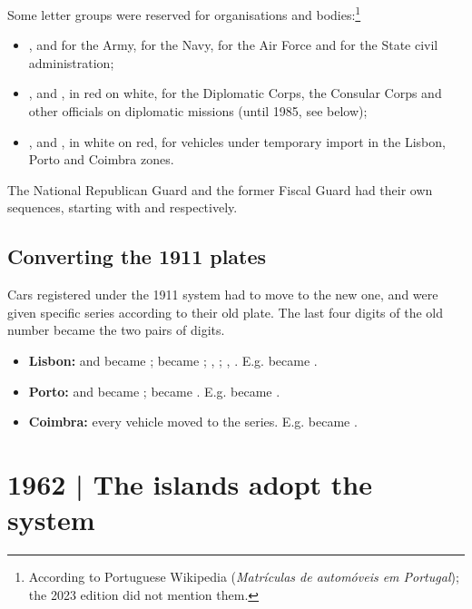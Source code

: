 Some letter groups were reserved for organisations and bodies:\footnote{According to Portuguese Wikipedia (\emph{Matrículas de automóveis em Portugal}); the 2023 edition did not mention them.}
\begin{itemize}
  \item {},  and  for the Army,  for the
        Navy,  for the Air Force and  for the State civil
        administration;
  \item {},  and , in red on white, for the Diplomatic
        Corps, the Consular Corps and other officials on diplomatic missions
        (until 1985, see below);
  \item {},  and , in white on red, for vehicles
        under temporary import in the Lisbon, Porto and Coimbra zones.
\end{itemize}
The National Republican Guard and the former Fiscal Guard had their own
sequences, starting with  and  respectively.

\subsection{Converting the 1911 plates}

Cars registered under the 1911 system had to move to the new one, and were given
specific series according to their old plate. The last four digits of the old
number became the two pairs of digits.

\begin{itemize}
  \item \textbf{Lisbon:}  and  became ;
         became ; ,
        ; , .
        E.g.  became .
  \item \textbf{Porto:}  and  became ;
         became .
        E.g.  became .
  \item \textbf{Coimbra:} every vehicle moved to the  series.
        E.g.  became .
\end{itemize}

\section{1962 | The islands adopt the system}


